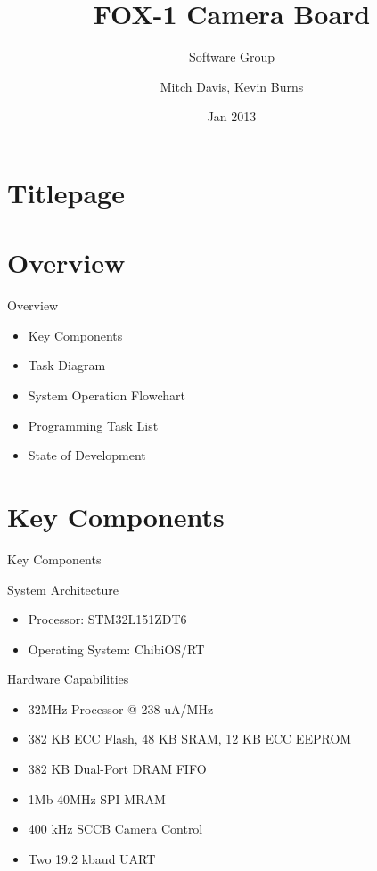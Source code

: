 \documentclass{beamer}
\author{Mitch Davis, Kevin Burns}
\title{FOX-1 Camera Board}
\subtitle{Software Group}
\institute{Virginia Tech}
\date{Jan 2013}
\begin{document}
\section{Titlepage}
\begin{frame}
\titlepage
\end{frame}

\section{Overview}
\begin{frame}{Overview}
	\begin{itemize}
		\item Key Components
		\item Task Diagram
		\item System Operation Flowchart
		\item Programming Task List
		\item State of Development
	\end{itemize}
\end{frame}

\section{Key Components}
\begin{frame}{Key Components}
	\begin{block}{System Architecture}
		\begin{itemize}
			\item Processor: STM32L151ZDT6
			\item Operating System: ChibiOS/RT
		\end{itemize}
	\end{block}
	\begin{block}{Hardware Capabilities}
		\begin{itemize}
			\item 32MHz Processor @ 238 uA/MHz
			\item 382 KB ECC Flash, 48 KB SRAM, 12 KB ECC EEPROM
			\item 382 KB Dual-Port DRAM FIFO
			\item 1Mb 40MHz SPI MRAM
			\item 400 kHz SCCB Camera Control
			\item Two 19.2 kbaud UART
		\end{itemize}
	\end{block}
\end{frame}
\end{document}
